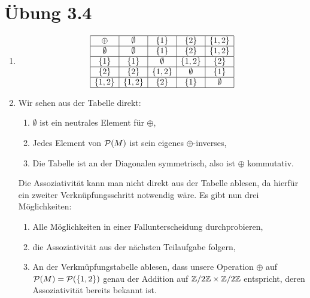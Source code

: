 \documentclass{article}
\begin{document}
\section*{Übung 3.4}
\separator
{}
\begin{enumerate}
	\item {}
	\begin{align*}
		\begin{array}{|c|c|c|c|c|}
			\hline
			\oplus & \emptyset & \qty{1} & \qty{2} & \qty{1,2}\\
			\hline
			\emptyset & \emptyset & \qty{1} & \qty{2} & \qty{1,2}\\
			\hline
			\qty{1} & \qty{1} & \emptyset & \qty{1,2} & \qty{2}\\
			\hline
			\qty{2} & \qty{2} & \qty{1,2} & \emptyset & \qty{1}\\
			\hline
			\qty{1,2} & \qty{1,2} & \qty{2} & \qty{1} & \emptyset\\
			\hline
		\end{array}
	\end{align*}
	\item {}
	
	Wir sehen aus der Tabelle direkt:
	\begin{enumerate}
		\item $\emptyset$ ist ein neutrales Element für $\oplus$,
		\item Jedes Element von $\mathcal{P}(M)$ ist sein eigenes $\oplus$-inverses,
		\item Die Tabelle ist an der Diagonalen symmetrisch, also ist $\oplus$ kommutativ.
	\end{enumerate}
	Die Assoziativität kann man nicht direkt aus der Tabelle ablesen, da hierfür ein zweiter Verknüpfungsschritt notwendig wäre. Es gibt nun drei Möglichkeiten:
	\begin{enumerate}
		\item Alle Möglichkeiten in einer Fallunterscheidung durchprobieren,
		\item die Assoziativität aus der nächsten Teilaufgabe folgern,
		\item An der Verkmüpfungstabelle ablesen, dass unsere Operation $\oplus$ auf $\mathcal{P}(M) = \mathcal{P}(\qty{1,2})$ genau der Addition auf $\mathbb{Z}/2\mathbb{Z} \times \mathbb{Z}/2\mathbb{Z}$ entspricht, deren Assoziativität bereits bekannt ist.
	\end{enumerate}
	 

\end{enumerate}
\end{document}
